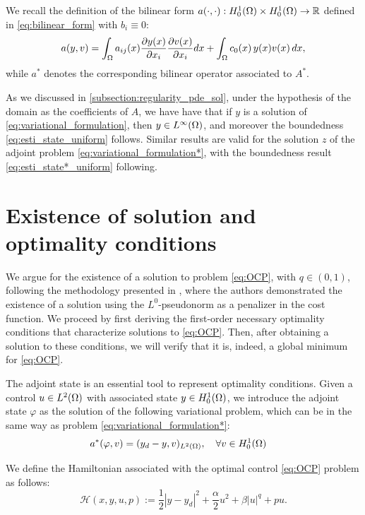 	We recall the definition of the bilinear form $a(\cdot, \cdot):H_{0}^{1}(\Omega) \times H_{0}^{1}(\Omega)\to \mathbb{R}$  
	defined in \eqref{eq:bilinear_form} with $b_i\equiv 0$:
	$$a(y,v)=\int_\Omega a_{ij}(x)\frac{\partial y(x)}{\partial x_i} \frac{\partial v(x)}{\partial x_i} dx + \int_\Omega c_0(x)\,y(x)v(x)\,dx, $$
	while $a^*$ denotes the corresponding bilinear operator associated to $A^*$.
	
	

As we discussed in \ref{subsection:regularity_pde_sol}, under the hypothesis of the domain as the
coefficients of $A$, we have have that if $y$ is a solution of \eqref{eq:variational_formulation}, then 
$y\in L^{\infty}(\Omega)$, and moreover the boundedness \eqref{eq:esti_state_uniform} follows. Similar results are valid for 
the solution $z$ of the adjoint problem \eqref{eq:variational_formulation*}, with the boundedness result 
\eqref{eq:esti_state*_uniform} following.  


	\section{Existence of solution and optimality conditions }
    
	We argue for the existence of a solution to problem \eqref{eq:OCP}, with $q\in (0,1)$,
	 following the methodology presented in \cite{ito-kunisch2014}, where the authors demonstrated the existence of a solution using the $L^0$-pseudonorm as a penalizer in the cost function. We proceed by first deriving the first-order necessary optimality conditions that characterize solutions to \eqref{eq:OCP}. Then, after obtaining a solution to these conditions, we will verify that it is, indeed, a global minimum for \eqref{eq:OCP}.
	
	The adjoint state is an essential tool to represent optimality conditions.
	 Given a control $u \in L^2(\Omega)$ with associated state $y\in H_{0}^{1}(\Omega)$, 
	 we introduce the adjoint state $\varphi$ as the solution of the following
	  variational problem, which can be in the same way as problem \eqref{eq:variational_formulation*}: 
	\begin{align}\label{eq:costate}
		&a^*(\varphi,v) = (y_d-y,v)_{L^2(\Omega)}, \quad \forall v \in H_{0}^{1}(\Omega)
	\end{align}	
	
	We define the Hamiltonian associated with the optimal control \eqref{eq:OCP} problem as follows:
	\begin{equation} \label{eq:Hamiltonian}
    \mathcal{H}(x,y,u,p):=\frac12 |y-y_d|^2+\frac{\alpha}{2}u^2 + \beta |u|^q + p u.
    \end{equation}
	
